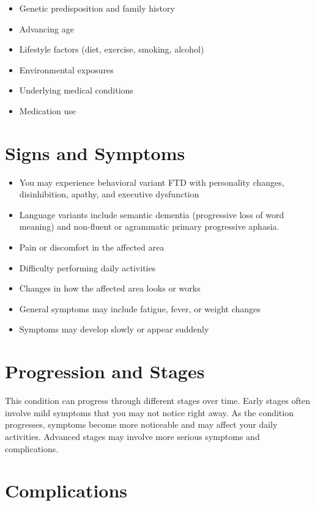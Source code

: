 \begin{itemize}[noitemsep]
  \item Genetic predisposition and family history
  \item Advancing age
  \item Lifestyle factors (diet, exercise, smoking, alcohol)
  \item Environmental exposures
  \item Underlying medical conditions
  \item Medication use
\end{itemize}

\section{Signs and Symptoms}

\begin{itemize}[noitemsep]
  \item You may experience behavioral variant FTD with personality changes, disinhibition, apathy, and executive dysfunction
  \item Language variants include semantic dementia (progressive loss of word meaning) and non-fluent or agrammatic primary progressive aphasia.
  \item Pain or discomfort in the affected area
  \item Difficulty performing daily activities
  \item Changes in how the affected area looks or works
  \item General symptoms may include fatigue, fever, or weight changes
  \item Symptoms may develop slowly or appear suddenly
\end{itemize}

\section{Progression and Stages}
This condition can progress through different stages over time. Early stages often involve mild symptoms that you may not notice right away. As the condition progresses, symptoms become more noticeable and may affect your daily activities. Advanced stages may involve more serious symptoms and complications.

\section{Complications}

